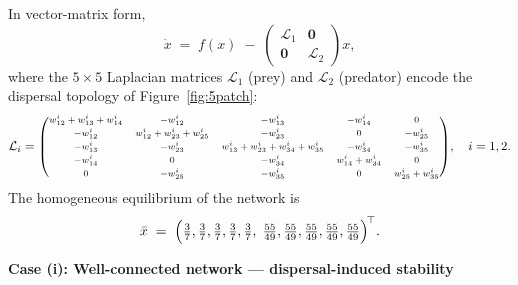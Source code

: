 \documentclass[12pt,a4paper]{article}
\theoremstyle{definition}
\begin{document}
In vector-matrix form,
\begin{equation*}
  \dot{x} \;=\; f(x) \;-\;
  \begin{pmatrix} \mathcal{L}_1 & \mathbf{0} \\
                  \mathbf{0} & \mathcal{L}_2 \end{pmatrix} x,
  \label{eq:ex2_vf}
\end{equation*}
where the $5\times 5$ Laplacian matrices $\mathcal{L}_1$ (prey) and
$\mathcal{L}_2$ (predator) encode the dispersal topology of
Figure~\ref{fig:5patch}:
\begin{equation*}
{\scriptsize
  \mathcal{L}_i
  = \begin{pmatrix}
      w^i_{12}+w^i_{13}+w^i_{14} & -w^i_{12} & -w^i_{13} & -w^i_{14} & 0 \\[2pt]
      -w^i_{12} & w^i_{12}+w^i_{23}+w^i_{25} & -w^i_{23} & 0 & -w^i_{25} \\[2pt]
      -w^i_{13} & -w^i_{23} & w^i_{13}+w^i_{23}+w^i_{34}+w^i_{35} & -w^i_{34} & -w^i_{35} \\[2pt]
      -w^i_{14} & 0 & -w^i_{34} & w^i_{14}+w^i_{34} & 0 \\[2pt]
      0 & -w^i_{25} & -w^i_{35} & 0 & w^i_{25}+w^i_{35}
    \end{pmatrix}},
  \quad i=1,2.
  \label{eq:ex2_Lap}
\end{equation*}
The homogeneous equilibrium of the network is
\begin{equation*}
  \bar{x}
  \;=\;
  \Bigl(
    \tfrac{3}{7},\tfrac{3}{7},\tfrac{3}{7},\tfrac{3}{7},\tfrac{3}{7},\;
    \tfrac{55}{49},\tfrac{55}{49},\tfrac{55}{49},\tfrac{55}{49},\tfrac{55}{49}
  \Bigr)^{\!\top}.
\end{equation*}

\noindent
\textbf{Case (i): Well-connected network --- dispersal-induced
stability}
\end{document}
